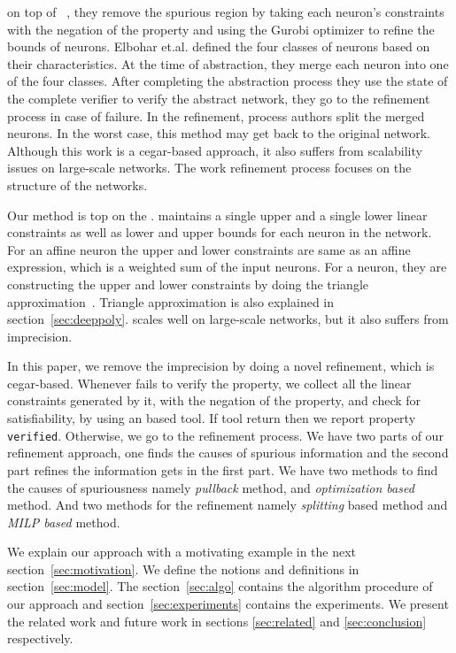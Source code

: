 on top of \deeppoly{}~\cite{singh2019abstract}, they remove
the spurious region by taking each neuron's constraints with the negation of the property and using the 
Gurobi optimizer \cite{gurobioptimizer} to refine the bounds of neurons.
Elbohar et.al. \cite{elboher2020abstraction} defined the four classes of neurons based on their characteristics.
At the time of abstraction, they merge each neuron into one of the four classes. 
After completing the abstraction process they use the state of the complete verifier to verify 
the abstract network, they go to the refinement process in case of failure.  
In the refinement, process authors split the merged neurons. 
In the worst case, this method may get back to the original network. 
Although this work is a cegar-based approach, it also suffers from scalability issues on large-scale networks.  
The work \cite{elboher2020abstraction} refinement process focuses on the structure of the networks.

Our method is top on the \deeppoly{}. 
\deeppoly{} maintains a single upper and a single lower linear constraints as well as lower and upper bounds
for each neuron in the network. For an affine neuron the upper and lower constraints are same as an affine expression, 
which is a weighted sum of the input neurons. For a \relu{} neuron, they are constructing the upper and lower constraints
by doing the triangle approximation~\cite{singh2019abstract}. 
Triangle approximation is also explained in section~\ref{sec:deeppoly}. 
\deeppoly{} scales well on large-scale networks, but it also suffers from imprecision. 

In this paper, we remove the imprecision by doing a novel refinement, which is cegar-based. 
Whenever \deeppoly{} fails to verify the property, we collect all the linear constraints generated by it, 
with the negation of the property, and check for satisfiability, by using an \milp{} based tool. 
If tool return \unsat{} then we report property \texttt{verified}. Otherwise, we go to the refinement process.
We have two parts of our refinement approach, one finds the causes of spurious information 
and the second part refines the information gets in the first part. 
We have two methods to find the causes of spuriousness namely {\em pullback} method, and 
{\em optimization based} method. And two methods for the refinement namely {\em splitting} based method and 
{\em MILP based} method.    

We explain our approach with a motivating example in the next section~\ref{sec:motivation}. 
We define the notions and definitions in section~\ref{sec:model}. The section~\ref{sec:algo} contains the 
algorithm procedure of our approach and section~\ref{sec:experiments} contains the experiments. 
We present the related work and future work in sections \ref{sec:related} and \ref{sec:conclusion} respectively. 


